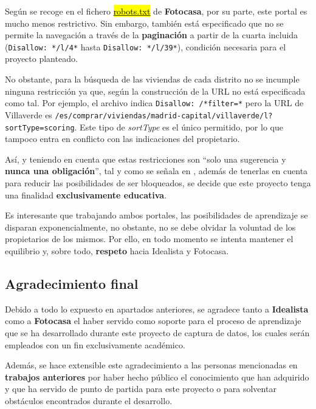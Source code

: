 \documentclass[12pt]{article}
\begin{document}
Según se recoge en el fichero \href{https://www.fotocasa.es/robots.txt}{\hl{robots.txt}} de \textbf{Fotocasa}, por su parte, este portal es mucho menos restrictivo. Sin embargo, también está especificado que no se permite la navegación a través de la \textbf{paginación} a partir de la cuarta incluida (\verb|Disallow: */l/4*| hasta \verb|Disallow: */l/39*|), condición necesaria para el proyecto planteado.

No obstante, para la búsqueda de las viviendas de cada distrito no se incumple ninguna restricción ya que, según la construcción de la URL no está especificada como tal. Por ejemplo, el archivo indica \verb|Disallow: /*filter=*| pero la URL de Villaverde es \verb|/es/comprar/viviendas/madrid-capital/villaverde/l?sortType=scoring|. Este tipo de \textit{sortType} es el único permitido, por lo que tampoco entra en conflicto con las indicaciones del propietario. 

Así, y teniendo en cuenta que estas restricciones son ``solo una sugerencia y \textbf{nunca una obligación}'', tal y como se señala en \cite{tip2}, además de tenerlas en cuenta para reducir las posibilidades de ser bloqueados, se decide que este proyecto tenga una finalidad \textbf{exclusivamente educativa}. 

Es interesante que trabajando ambos portales, las posibilidades de aprendizaje se disparan exponencialmente, no obstante, no se debe olvidar la voluntad de los propietarios de los mismos. Por ello, en todo momento se intenta mantener el equilibrio y, sobre todo, \textbf{respeto} hacia Idealista y Fotocasa. 

\vspace{-1.5em}\subsection*{Agradecimiento final}\vspace{-1.0em}

Debido a todo lo expuesto en apartados anteriores, se agradece tanto a \textbf{Idealista} como a \textbf{Fotocasa} el haber servido como soporte para el proceso de aprendizaje que se ha desarrollado durante este proyecto de captura de datos, los cuales serán empleados con un fin exclusivamente académico. 

Además, se hace extensible este agradecimiento a las personas mencionadas en \textbf{trabajos anteriores} por haber hecho público el conocimiento que han adquirido y que ha servido de punto de partida para este proyecto o para solventar obstáculos encontrados durante el desarrollo. 
\end{document}
